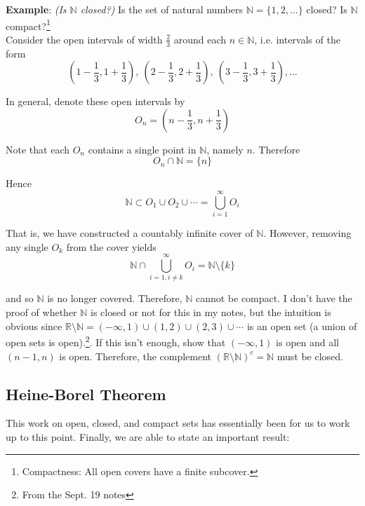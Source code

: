 \documentclass[12pt]{article}
\newlength\tindent
\renewcommand{\indent}{\hspace*{\tindent}}
\newcommand{\R}{\mathbb R}
\newcommand{\N}{\mathbb N}
\begin{document}
%
%
{\bf Example}: {\em (Is $\N$ closed?)} Is the set of natural numbers $\N = \{1, 2, ...\}$ closed? Is $\N$ compact?\footnote{Compactness: All open covers have a finite subcover.} \\

Consider the open intervals of width $\frac{2}{3}$ around each $n \in \N$, i.e. intervals of the form
\begin{equation*}
	\left( 1 - \frac{1}{3}, 1 + \frac{1}{3} \right), ~ \left( 2 - \frac{1}{3}, 2 + \frac{1}{3} \right), ~ \left( 3 - \frac{1}{3}, 3 + \frac{1}{3} \right), ...
\end{equation*}

In general, denote these open intervals by
\begin{equation*}
	O_n = \left( n - \frac{1}{3}, n + \frac{1}{3} \right)
\end{equation*}

Note that each $O_n$ contains a single point in $\N$, namely $n$. Therefore
\begin{equation*}
	O_n \cap \N = \{n\}
\end{equation*}

Hence
\begin{equation*}
	\N \subset O_1 \cup O_2 \cup \cdots = \bigcup^\infty_{i = 1} O_i
\end{equation*}

\indent That is, we have constructed a countably infinite cover of $\N$. However, removing any single $O_k$ from the cover yields
\begin{equation*}
	\N \cap \bigcup^\infty_{i = 1, i \neq k} O_i = \N \setminus \{k\}
\end{equation*}

and so $\N$ is no longer covered. Therefore, $\N$ cannot be compact. I don't have the proof of whether $\N$ is closed or not for this in my notes, but the intuition is obvious since $\R\setminus \N = (-\infty, 1)\cup(1, 2)\cup(2, 3)\cup\cdots$ is an open set (a union of open sets is open).\footnote{From the Sept. 19 notes}. If this isn't enough, show that $(-\infty, 1)$ is open and all $(n - 1, n)$ is open. Therefore, the complement $(\R\setminus\N)^c = \N$ must be closed. \\

\subsection{Heine-Borel Theorem}

\indent This work on open, closed, and compact sets has essentially been for us to work up to this point. Finally, we are able to state an important result: \\
\end{document}
